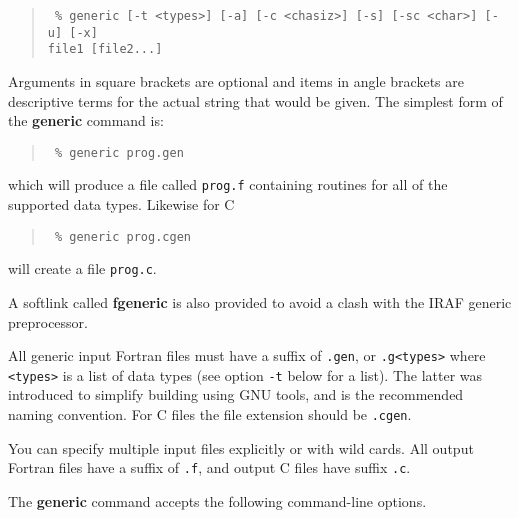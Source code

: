 \documentclass[twoside,11pt]{article}
\renewcommand{\_}{{\tt\char'137}}     %
\begin{document}
\begin{quote}{\tt
\% generic [-t <types>] [-a] [-c <chasiz>] [-s] [-sc <char>] [-u] [-x] \\
           file1 [file2...]}
\end{quote}

Arguments in square brackets are optional and items in angle brackets are
descriptive terms for the actual string that would be given.  The simplest form
of the {\bf generic} command is:

\begin{quote}{\tt
\% generic prog.gen
}
\end{quote}

which will produce a file called {\tt prog.f} containing routines for
all of the supported data types.  Likewise for C

\begin{quote}{\tt
\% generic prog.cgen
}
\end{quote}
will create a file {\tt prog.c}.

A softlink called {\bf fgeneric} is also provided to avoid a clash
with the IRAF generic preprocessor.

All generic input Fortran files must have a suffix of {\tt .gen}, or
{\tt .g\verb+<types>+} where \verb+<types>+ is a list of data types
(see option {\tt -t} below for a list).  The latter was introduced to
simplify building using GNU tools, and is the recommended naming
convention.  For C files the file extension should be {\tt .cgen}.

You can specify multiple input files explicitly or with wild cards.
All output Fortran files have a suffix of {\tt .f}, and output C files
have suffix {\tt .c}.

The {\bf generic} command accepts the following command-line options.
\end{document}
